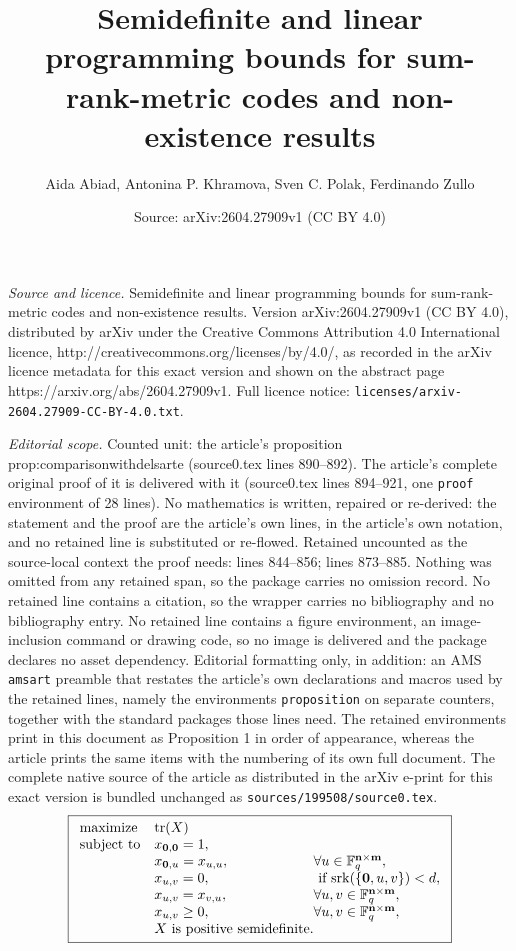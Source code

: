 \documentclass[10pt,a4paper]{amsart}
\title{Semidefinite and linear programming bounds for sum-rank-metric codes and non-existence results}
\author{Aida Abiad, Antonina P. Khramova, Sven C. Polak, Ferdinando Zullo}
\date{Source: arXiv:2604.27909v1 (CC BY 4.0)}
\newcommand{\F}{\mathbb{F}}
\newcommand{\bfm}{\mathbf {m}}
\newcommand{\bfn}{\mathbf {n}}
\newcommand{\spac}{\F^{\bfn\times\bfm}_q}
\newcommand{\srk}{\mathrm{srk}}
\DeclareMathOperator{\tr}{tr}
\begin{document}
\maketitle

\noindent\emph{Source and licence.} Semidefinite and linear programming bounds for sum-rank-metric codes and non-existence results. Version arXiv:2604.27909v1 (CC BY 4.0), distributed by arXiv under the Creative Commons Attribution 4.0 International licence, http://creativecommons.org/licenses/by/4.0/, as recorded in the arXiv licence metadata for this exact version and shown on the abstract page https://arxiv.org/abs/2604.27909v1. Full licence notice: \texttt{licenses/arxiv-2604.27909-CC-BY-4.0.txt}.\par\smallskip

\noindent\textit{Editorial scope.} Counted unit: the article's proposition prop:comparisonwithdelsarte (source0.tex lines 890--892). The article's complete original proof of it is delivered with it (source0.tex lines 894--921, one \texttt{proof} environment of 28 lines). No mathematics is written, repaired or re-derived: the statement and the proof are the article's own lines, in the article's own notation, and no retained line is substituted or re-flowed.  Retained uncounted as the source-local context the proof needs: lines 844--856; lines 873--885.  Nothing was omitted from any retained span, so the package carries no omission record.  No retained line contains a citation, so the wrapper carries no bibliography and no bibliography entry.  No retained line contains a figure environment, an image-inclusion command or drawing code, so no image is delivered and the package declares no asset dependency.  Editorial formatting only, in addition: an AMS \texttt{amsart} preamble that restates the article's own declarations and macros used by the retained lines, namely the environments \texttt{proposition} on separate counters, together with the standard packages those lines need.  The retained environments print in this document as Proposition 1 in order of appearance, whereas the article prints the same items with the numbering of its own full document.  The complete native source of the article as distributed in the arXiv e-print for this exact version is bundled unchanged as \texttt{sources/199508/source0.tex}.
\begin{equation}\label{eq:julia}
\boxed{
\begin{array}{ll@{}l}
\text{maximize}  &\tr(X) &\\
\text{subject to} &x_{{\bf 0},{\bf 0}}=1,~&\\
&x_{{\bf 0},u}=x_{u,u},~& \forall u\in\spac,\\
&x_{u,v}=0,~& \text{ if }\srk(\{{\bf 0},u,v\})<d,\\
&x_{u,v}=x_{v,u},~& \forall u,v\in\spac,\\
&x_{u,v}\geq0,~& \forall u,v\in\spac,\\
&X\text{ is positive semidefinite.}
\end{array}
}
\end{equation}
\end{document}
